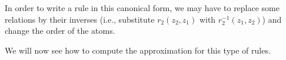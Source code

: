 In order to write a rule in this canonical form, we may have to replace some relations by their inverses
(i.e., substitute $r_2(z_2,z_1)$ with $r_2^{-1}(z_1,z_2)$) and change the order of the atoms.

We will now see how to compute the approximation for this type of rules.




%
%


